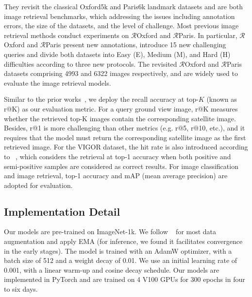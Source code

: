 \documentclass[sn-basic,iicol]{sn-jnl}
\theoremstyle{thmstyletwo}\newtheorem{example}{Example}\newtheorem{remark}{Remark}
\theoremstyle{thmstylethree}\newtheorem{definition}{Definition}
\begin{document}
They revisit the classical Oxford5k and Paris6k landmark datasets and are both image retrieval benchmarks, which addressing the issues including annotation errors, the size of the datasets, and the level of challenge. Most previous image retrieval methods conduct experiments on $\mathcal{R}$Oxford and $\mathcal{R}$Paris. In particular, $\mathcal{R}$Oxford and $\mathcal{R}$Paris present new annotations, introduce 15 new challenging queries and divide both datasets into Easy (E), Medium (M), and Hard (H) difficulties according to three new protocols. The revisited $\mathcal{R}$Oxford and $\mathcal{R}$Paris datasets comprising 4993 and 6322 images respectively, and are widely used to evaluate the image retrieval models.

Similar to the prior works~\citep{CVUSA,hu2018cvm,SAFA2019}, we deploy the recall accuracy at top-$K$ (known as r@K) as our evaluation metric. For a query ground view image, r@K measures whether the retrieved top-K images contain the corresponding satellite image. Besides, r@1 is more challenging than other metrics (e.g. r@5, r@10, etc.), and it requires that the model must return the corresponding satellite image as the first retrieved image. For the VIGOR dataset, the hit rate is also introduced according to ~\citep{VIGOR2021}, which considers the retrieval at top-1 accuracy when both positive and semi-positive samples are considered as correct results. For image classification and image retrieval, top-1 accuracy and mAP (mean average precision) are adopted for evaluation.









\subsection{Implementation Detail}








 Our models are pre-trained on ImageNet-1k. We follow ~\citep{DeiT} for most data augmentation and apply EMA (for inference, we found it facilitates convergence in the early stages). The model is trained with an AdamW optimizer, with a batch size of 512 and a weight decay of 0.01. We use an initial learning rate of 0.001, with a linear warm-up and cosine decay schedule. Our models are implemented in PyTorch and are trained on 4 V100 GPUs for 300 epochs in four to six days.
\end{document}
